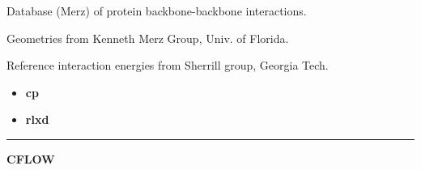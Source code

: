 \documentclass[letterpaper,10pt,english]{sphinxmanual}
\begin{document}
\begin{DUlineblock}{0em}
\item[] Database (Merz) of protein backbone-backbone interactions.
\item[] Geometries from Kenneth Merz Group, Univ. of Florida.
\item[] Reference interaction energies from Sherrill group, Georgia Tech.
\end{DUlineblock}
\begin{itemize}
\item {} 
\textbf{cp}   \textbar{}\textbar{} 

\item {} 
\textbf{rlxd} 

\end{itemize}


\bigskip\hrule{}\bigskip

\label{index:module-CFLOW}
\textbf{CFLOW}
\end{document}
